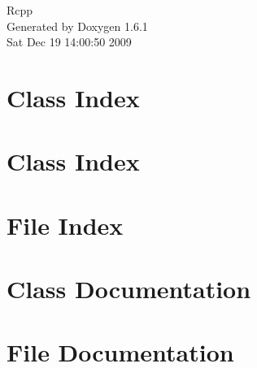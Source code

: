 \documentclass[a4paper]{book}
\begin{document}
\hypersetup{pageanchor=false}
\begin{titlepage}
\vspace*{7cm}
\begin{center}
{\Large Rcpp }\\
\vspace*{1cm}
{\large Generated by Doxygen 1.6.1}\\
\vspace*{0.5cm}
{\small Sat Dec 19 14:00:50 2009}\\
\end{center}
\end{titlepage}
\clearemptydoublepage
{}
\tableofcontents
\clearemptydoublepage
{}
\hypersetup{pageanchor=true}
\chapter{Class Index}

\chapter{Class Index}

\chapter{File Index}

\chapter{Class Documentation}




















\chapter{File Documentation}






































\printindex
\end{document}
